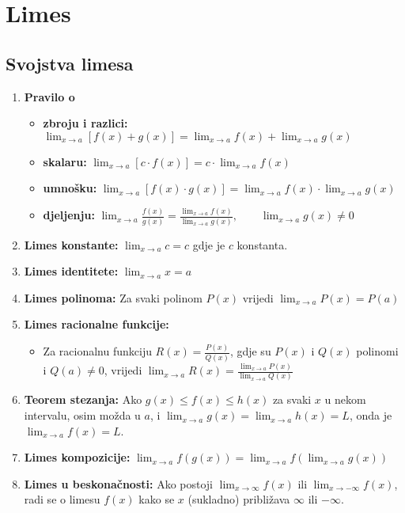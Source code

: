 \section{Limes}

\subsection{Svojstva limesa}

\begin{enumerate}
    \item \textbf{Pravilo o}
    \begin{itemize}
        \item \textbf{zbroju i razlici:} $\displaystyle \lim_{x \to a} [f(x) + g(x)] = \lim_{x \to a} f(x) + \lim_{x \to a} g(x)$
        \item \textbf{skalaru:} $\displaystyle \lim_{x \to a} [c \cdot f(x)] = c \cdot \lim_{x \to a} f(x)$
        \item \textbf{umnošku:} $\displaystyle \lim_{x \to a} [f(x) \cdot g(x)] = \lim_{x \to a} f(x) \cdot \lim_{x \to a} g(x)$
        \item \textbf{djeljenju:} $\displaystyle \lim_{x \to a} \frac{f(x)}{g(x)} = \frac{\lim_{x \to a} f(x)}{\lim_{x \to a} g(x)},\qquad \lim_{x \to a} g(x) \neq 0$
    \end{itemize}
    
    \item \textbf{Limes konstante:} $\displaystyle \lim_{x \to a} c = c$ gdje je $c$ konstanta.
    
    \item \textbf{Limes identitete:} $\displaystyle \lim_{x \to a} x = a$
    
    \item \textbf{Limes polinoma:} Za svaki polinom $P(x)$ vrijedi $\displaystyle \lim_{x \to a} P(x) = P(a)$
    
    \item \textbf{Limes racionalne funkcije:} 
    \begin{itemize}
        \item Za racionalnu funkciju $\displaystyle R(x) = \frac{P(x)}{Q(x)}$, gdje su $P(x)$ i $Q(x)$ polinomi i $Q(a) \neq 0$, vrijedi
              $\displaystyle \lim_{x \to a} R(x) = \frac{\lim_{x \to a} P(x)}{\lim_{x \to a} Q(x)}$
    \end{itemize}
    
    \item \textbf{Teorem stezanja:} Ako $g(x) \leq f(x) \leq h(x)$ za svaki $x$ u nekom intervalu, osim možda u $a$, i $\displaystyle \lim_{x \to a} g(x) = \lim_{x \to a} h(x) = L$, onda je $\displaystyle \lim_{x \to a} f(x) = L$.
    
    \item \textbf{Limes kompozicije:} $\displaystyle \lim_{x \to a} f(g(x)) = \lim_{x \to a} f(\lim_{x \to a} g(x))$
    
    \item \textbf{Limes u beskonačnosti:} Ako postoji $\displaystyle \lim_{x \to \infty} f(x)$ ili $\displaystyle \lim_{x \to -\infty} f(x)$, radi se o limesu $f(x)$ kako se $x$ (sukladno) približava $\infty$ ili $-\infty$.
\end{enumerate}